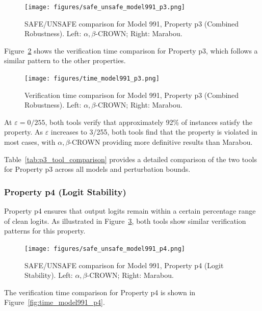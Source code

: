 \begin{figure}[htbp]
    \centering
    \texttt{[image: figures/safe\_unsafe\_model991\_p3.png]}
    \caption{SAFE/UNSAFE comparison for Model 991, Property p3 (Combined Robustness). Left: $\alpha, \beta$-CROWN; Right: Marabou.}
    \label{fig:safe_unsafe_model991_p3}
\end{figure}

Figure~\ref{fig:time_model991_p3} shows the verification time comparison for Property p3, which follows a similar pattern to the other properties.

\begin{figure}[htbp]
    \centering
    \texttt{[image: figures/time\_model991\_p3.png]}
    \caption{Verification time comparison for Model 991, Property p3 (Combined Robustness). Left: $\alpha, \beta$-CROWN; Right: Marabou.}
    \label{fig:time_model991_p3}
\end{figure}

At $\varepsilon = 0/255$, both tools verify that approximately 92\% of instances satisfy the property. As $\varepsilon$ increases to 3/255, both tools find that the property is violated in most cases, with $\alpha, \beta$-CROWN providing more definitive results than Marabou.

Table~\ref{tab:p3_tool_comparison} provides a detailed comparison of the two tools for Property p3 across all models and perturbation bounds.



\subsubsection{Property p4 (Logit Stability)}

Property p4 ensures that output logits remain within a certain percentage range of clean logits. As illustrated in Figure~\ref{fig:safe_unsafe_model991_p4}, both tools show similar verification patterns for this property.

\begin{figure}[htbp]
    \centering
    \texttt{[image: figures/safe\_unsafe\_model991\_p4.png]}
    \caption{SAFE/UNSAFE comparison for Model 991, Property p4 (Logit Stability). Left: $\alpha, \beta$-CROWN; Right: Marabou.}
    \label{fig:safe_unsafe_model991_p4}
\end{figure}

The verification time comparison for Property p4 is shown in Figure~\ref{fig:time_model991_p4}.

